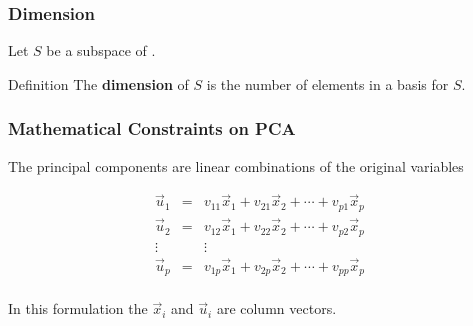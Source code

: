 \documentclass{beamer}
\begin{document}
\begin{frame}
  \frametitle{Dimension}
Let $S$ be a subspace of \RealN.
\bigskip

\begin{block}{Definition}
The \textbf{dimension} of $S$ is the number of elements in a basis for $S$.
\end{block}

\end{frame}






\begin{frame}
  \frametitle{Mathematical Constraints on PCA}

The principal components are linear combinations of the original variables
\smallskip

\[ \begin{array}{ccc}
\vec{u}_1 & = & v_{11}\vec{x}_1 + v_{21}\vec{x}_2 + \cdots + v_{p1}\vec{x}_p \\
\vec{u}_2 & = & v_{12}\vec{x}_1 + v_{22}\vec{x}_2 + \cdots + v_{p2}\vec{x}_p \\
\vdots & & \vdots \\
\vec{u}_p & = & v_{1p}\vec{x}_1 + v_{2p}\vec{x}_2 + \cdots + v_{pp}\vec{x}_p \\
\end{array}
\]

\bigskip

In this formulation the $\vec{x}_i$ and $\vec{u}_i$ are column vectors.
\end{frame}
\end{document}

